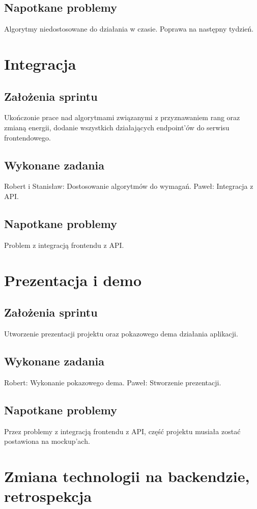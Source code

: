 \documentclass[a4paper,11pt]{report}
\begin{document}
\subsection {Napotkane problemy}
Algorytmy niedostosowane do działania w czasie. Poprawa na następny tydzień.

\section {Integracja}
\subsection {Założenia sprintu}
Ukończonie prace nad algorytmami związanymi z przyznawaniem rang oraz zmianą energii, dodanie wszystkich działających endpoint’ów do serwisu frontendowego.
\subsection {Wykonane zadania}
Robert i Stanisław: Dostosowanie algorytmów do wymagań. 
Paweł: Integracja z API.
\subsection {Napotkane problemy}
Problem z integracją frontendu z API.

\section {Prezentacja i demo}
\subsection {Założenia sprintu}
Utworzenie prezentacji projektu oraz pokazowego dema działania aplikacji.
\subsection {Wykonane zadania}
Robert: Wykonanie pokazowego dema. 
Paweł: Stworzenie prezentacji.
\subsection {Napotkane problemy}
Przez problemy z integracją frontendu z API, część projektu musiała zostać postawiona na mockup'ach.

\section {Zmiana technologii na backendzie, retrospekcja}
\end{document}
